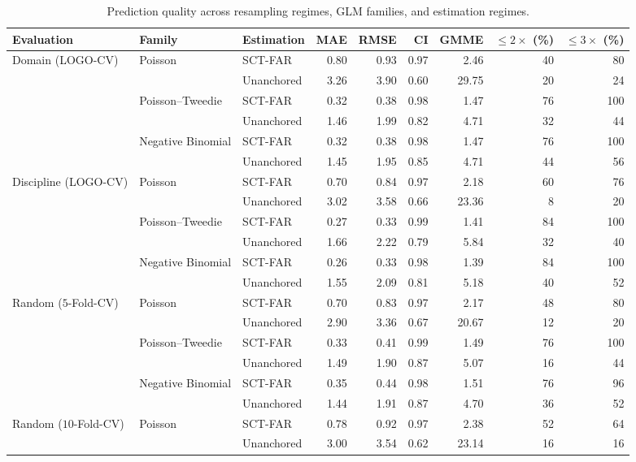 \documentclass{article}
\begin{document}
\clearpage
\begin{table}[H]
\centering
\footnotesize
\captionsetup{position=top,skip=12pt}
\caption{Prediction quality across resampling regimes, GLM families, and estimation regimes.}
\label{tab:si-quality}
\begin{tabularx}{\linewidth}{@{}lXlrrrrrr@{}}
\toprule
Evaluation & Family & Estimation & MAE & RMSE & CI & GMME & $\le 2\times$ (\%) & $\le 3\times$ (\%) \\
\midrule
Domain (LOGO-CV) & Poisson & SCT-FAR & 0.80 & 0.93 & 0.97 & 2.46 & 40 & 80 \\
 &  & Unanchored & 3.26 & 3.90 & 0.60 & 29.75 & 20 & 24 \\
 & Poisson--Tweedie & SCT-FAR & 0.32 & 0.38 & 0.98 & 1.47 & 76 & 100 \\
 &  & Unanchored & 1.46 & 1.99 & 0.82 & 4.71 & 32 & 44 \\
 & Negative Binomial & SCT-FAR & 0.32 & 0.38 & 0.98 & 1.47 & 76 & 100 \\
 &  & Unanchored & 1.45 & 1.95 & 0.85 & 4.71 & 44 & 56 \\
\addlinespace
Discipline (LOGO-CV) & Poisson & SCT-FAR & 0.70 & 0.84 & 0.97 & 2.18 & 60 & 76 \\
 &  & Unanchored & 3.02 & 3.58 & 0.66 & 23.36 & 8 & 20 \\
 & Poisson--Tweedie & SCT-FAR & 0.27 & 0.33 & 0.99 & 1.41 & 84 & 100 \\
 &  & Unanchored & 1.66 & 2.22 & 0.79 & 5.84 & 32 & 40 \\
 & Negative Binomial & SCT-FAR & 0.26 & 0.33 & 0.98 & 1.39 & 84 & 100 \\
 &  & Unanchored & 1.55 & 2.09 & 0.81 & 5.18 & 40 & 52 \\
\addlinespace
Random ($5$-Fold-CV) & Poisson & SCT-FAR & 0.70 & 0.83 & 0.97 & 2.17 & 48 & 80 \\
 &  & Unanchored & 2.90 & 3.36 & 0.67 & 20.67 & 12 & 20 \\
 & Poisson--Tweedie & SCT-FAR & 0.33 & 0.41 & 0.99 & 1.49 & 76 & 100 \\
 &  & Unanchored & 1.49 & 1.90 & 0.87 & 5.07 & 16 & 44 \\
 & Negative Binomial & SCT-FAR & 0.35 & 0.44 & 0.98 & 1.51 & 76 & 96 \\
 &  & Unanchored & 1.44 & 1.91 & 0.87 & 4.70 & 36 & 52 \\
\addlinespace
Random ($10$-Fold-CV) & Poisson & SCT-FAR & 0.78 & 0.92 & 0.97 & 2.38 & 52 & 64 \\
 &  & Unanchored & 3.00 & 3.54 & 0.62 & 23.14 & 16 & 16 \\

\end{tabularx}
\end{table}
\end{document}
